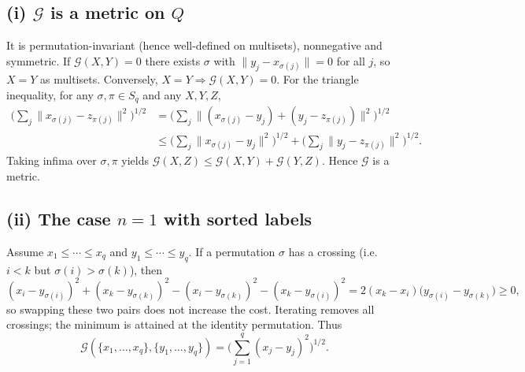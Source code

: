 \documentclass[11pt,a4paper]{article}
\theoremstyle{definition}
\theoremstyle{definition}
\theoremstyle{plain}
\theoremstyle{remark}
\begin{document}
\subsection*{(i) $\mathcal{G}$ is a metric on $Q$}
It is permutation-invariant (hence well-defined on multisets), nonnegative and symmetric.
If $\mathcal{G}(X,Y)=0$ there exists $\sigma$ with $\|y_j-x_{\sigma(j)}\|=0$ for all $j$, so $X=Y$ as multisets. Conversely, $X=Y \Rightarrow \mathcal{G}(X,Y)=0$.
For the triangle inequality, for any $\sigma,\pi\in S_q$ and any $X,Y,Z$,
\[
\begin{aligned}
	\Big(\sum_{j}\|x_{\sigma(j)}-z_{\pi(j)}\|^2\Big)^{1/2}
	&=\Big(\sum_{j}\|(x_{\sigma(j)}-y_j)+(y_j-z_{\pi(j)})\|^2\Big)^{1/2}\\
	&\le \Big(\sum_{j}\|x_{\sigma(j)}-y_j\|^2\Big)^{1/2}
	+ \Big(\sum_{j}\|y_j-z_{\pi(j)}\|^2\Big)^{1/2}.
\end{aligned}
\]
Taking infima over $\sigma,\pi$ yields $\mathcal{G}(X,Z)\le \mathcal{G}(X,Y)+\mathcal{G}(Y,Z)$.
Hence $\mathcal{G}$ is a metric.

\subsection*{(ii) The case $n=1$ with sorted labels}
Assume $x_1\le\cdots\le x_q$ and $y_1\le\cdots\le y_q$. If a permutation $\sigma$ has a crossing (i.e.\ $i<k$ but $\sigma(i)>\sigma(k)$), then
\[
(x_i-y_{\sigma(i)})^2+(x_k-y_{\sigma(k)})^2
-(x_i-y_{\sigma(k)})^2-(x_k-y_{\sigma(i)})^2
=2(x_k-x_i)\big(y_{\sigma(i)}-y_{\sigma(k)}\big)\ge0,
\]
so swapping these two pairs does not increase the cost. Iterating removes all crossings; the minimum is attained at the identity permutation. Thus
\[
\mathcal{G}(\{x_1,\dots,x_q\},\{y_1,\dots,y_q\})
=\Big(\sum_{j=1}^q (x_j-y_j)^2\Big)^{1/2}.
\]
\end{document}

